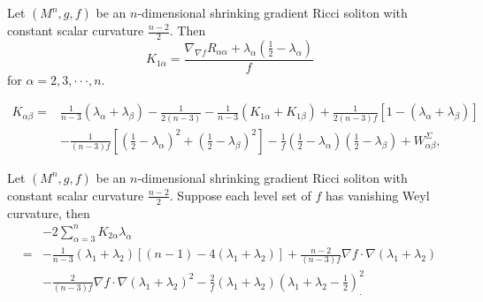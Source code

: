 \documentclass[10pt,a4paper]{amsart}
\begin{document}
	\begin{lem} Let $(M^n, g, f)$ be an $n$-dimensional shrinking gradient Ricci soliton with constant scalar curvature $\frac{n-2}{2}$. Then
		\begin{equation}\label{k1a}
		K_{1\alpha}=\frac{\nabla_{\nabla f}R_{\alpha\alpha} +\lambda_\alpha(\frac{1}{2}-\lambda_\alpha)}{f}
		\end{equation}	
		for $\alpha=2,  3, \cdot\cdot\cdot, n$.	
	\end{lem}

	\begin{equation}\label{kab}
	\begin{aligned}
	K_{\alpha \beta }=&{\frac{1}{n-3}}(\lambda_{\alpha}+\lambda_{\beta})-{\frac{1}{2(n-3)}}-{\frac{1}{n-3}}(K_{1\alpha }+K_{1\beta })+{\frac{1}{2(n-3)f}}[1-(\lambda_{\alpha }+\lambda_{\beta})] \\
	&- {\frac{1}{(n-3)f}}\left[ ({\frac{1}{2}}-\lambda_{\alpha})^2+({\frac{1}{2}}-\lambda_{\beta})^2\right]-{\frac{1}{f}}({\frac{1}{2}}-\lambda_{\alpha})({\frac{1}{2}}-\lambda_{\beta})+W^{\Sigma}_{\alpha \beta},
	\end{aligned}
	\end{equation}

	\begin{lem}\label{lek2a}
		Let $(M^n, g, f)$ be an $n$-dimensional shrinking gradient Ricci soliton with constant scalar curvature $\frac{n-2}{2}$. Suppose each level set of $f$ has vanishing Weyl curvature, then
 \begin{equation*}
	\begin{aligned}
		&-2\sum_{\alpha=3}^n K_{2\alpha}\lambda_\alpha\\
		=&-\frac{1}{n-3}(\lambda_1+\lambda_2)[(n-1)-4(\lambda_1+\lambda_2)] +\frac{n-2}{(n-3)f}\nabla f\cdot \nabla (\lambda_1+\lambda_2)\\
		&-\frac{2}{(n-3)f}\nabla f\cdot \nabla(\lambda_1+\lambda_2)^2
		-\frac{2}{f}(\lambda_1+\lambda_2)({\lambda_1+\lambda_2-\frac{1}{2}})^2  _.
	\end{aligned}
\end{equation*}
\end{lem}
\end{document}
